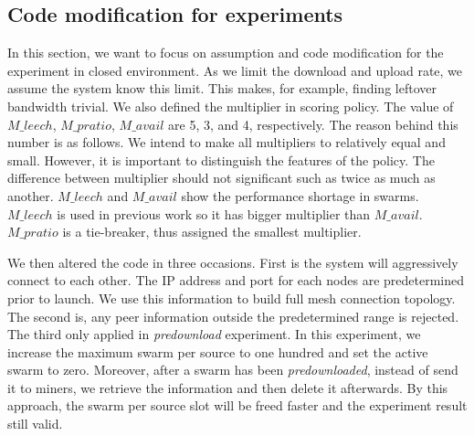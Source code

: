 %

\subsection{Code modification for experiments}
\label{section:predlsetup}
In this section, we want to focus on assumption and code modification for the experiment in closed environment. As we limit the download and upload rate, we assume the system know this limit. This makes, for example, finding leftover bandwidth trivial. We also defined the multiplier in scoring policy. The value of $M\_leech$, $M\_pratio$, $M\_avail$ are 5, 3, and 4, respectively. The reason behind this number is as follows. We intend to make all multipliers to relatively equal and small. However, it is important to distinguish the features of the policy. The difference between multiplier should not significant such as twice as much as another. $M\_leech$ and $M\_avail$ show the performance shortage in swarms. $M\_leech$ is used in previous work so it has bigger multiplier than $M\_avail$. $M\_pratio$ is a tie-breaker, thus assigned the smallest multiplier.

We then altered the code in three occasions. First is the system will aggressively connect to each other. The IP address and port for each nodes are predetermined prior to launch. We use this information to build full mesh connection topology. The second is, any peer information outside the predetermined range is rejected. The third only applied in \textit{predownload} experiment. In this experiment, we increase the maximum swarm per source to one hundred and set the active swarm to zero. Moreover, after a swarm has been \textit{predownloaded}, instead of send it to miners, we retrieve the information and then delete it afterwards. By this approach, the swarm per source slot will be freed faster and the experiment result still valid. 

